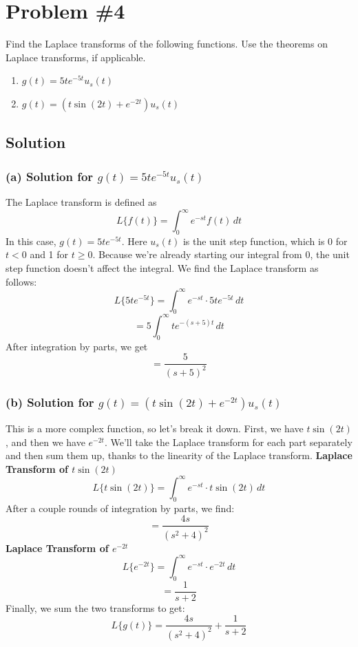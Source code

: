 \documentclass[12pt]{article}
\begin{document}
\section*{Problem \#4}
Find the Laplace transforms of the following functions. Use the theorems on Laplace transforms, if applicable.
\begin{enumerate}
  \item \( g(t) = 5t e^{-5t} u_s(t) \)
  \item \( g(t) = (t \sin(2t) + e^{-2t}) u_s(t) \)
\end{enumerate}

\subsection*{Solution}

\subsubsection*{(a) Solution for \( g(t) = 5t e^{-5t} u_s(t) \)}

The Laplace transform is defined as
\[
L\{ f(t) \} = \int_{0}^{\infty} e^{-st} f(t) \, dt
\]
\newline
In this case, \( g(t) = 5t e^{-5t} \). Here \( u_s(t) \) is the unit step function, which is 0 for \( t < 0 \) and 1 for \( t \geq 0 \). Because we're already starting our integral from 0, the unit step function doesn't affect the integral.
\newline \newline
We find the Laplace transform as follows:
\[
L\{ 5t e^{-5t} \} = \int_{0}^{\infty} e^{-st} \cdot 5t e^{-5t} \, dt
\]
\[
= 5 \int_{0}^{\infty} t e^{- (s+5) t} \, dt
\]
After integration by parts, we get
\[
= \frac{5}{(s + 5)^2}
\]
\newpage
\subsubsection*{(b) Solution for \( g(t) = (t \sin(2t) + e^{-2t}) u_s(t) \)}

This is a more complex function, so let's break it down.
\newline
\newline
First, we have \( t \sin(2t) \), and then we have \( e^{-2t} \). We'll take the Laplace transform for each part separately and then sum them up, thanks to the linearity of the Laplace transform.
\newline \newline
\textbf{Laplace Transform of \( t \sin(2t) \)}
\[
L\{ t \sin(2t) \} = \int_{0}^{\infty} e^{-st} \cdot t \sin(2t) \, dt
\]
After a couple rounds of integration by parts, we find:
\[
= \frac{4s}{(s^2 + 4)^2}
\]
\newline \newline
\textbf{Laplace Transform of \( e^{-2t} \)}
\[
L\{ e^{-2t} \} = \int_{0}^{\infty} e^{-st} \cdot e^{-2t} \, dt
\]
\[
= \frac{1}{s + 2}
\]
\newline
Finally, we sum the two transforms to get:
\[
L\{ g(t) \} = \frac{4s}{(s^2 + 4)^2} + \frac{1}{s + 2}
\]
\newpage
\end{document}
